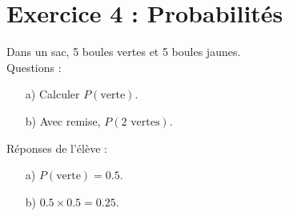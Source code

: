 \documentclass{article}
\begin{document}
\section*{Exercice 4 : Probabilités}
Dans un sac, 5 boules vertes et 5 boules jaunes.\\
Questions :
\begin{enumerate}
    \item[a)] Calculer $P(\text{verte})$.
    \item[b)] Avec remise, $P(2 \text{ vertes})$.
\end{enumerate}
Réponses de l'élève :
\begin{enumerate}
    \item[a)] $P(\text{verte}) = 0.5$.
    \item[b)] $0.5 \times 0.5 = 0.25$.
\end{enumerate}
\end{document}
